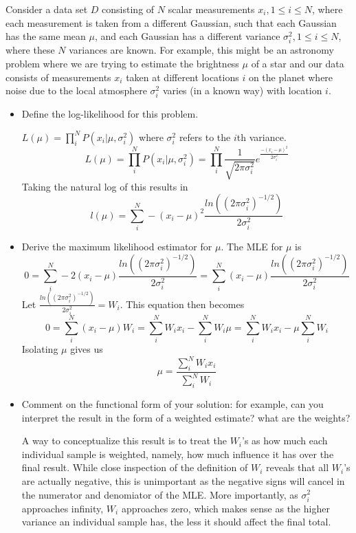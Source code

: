 \documentclass[11pt]{article}
\begin{document}
Consider a data set $D$ consisting of $N$ scalar measurements
$x_i, 1 \le i \le N$, where each measurement is taken from a
different Gaussian, such that each Gaussian has the same mean
$\mu$, and each Gaussian has a different variance $\sigma_i^2, 1
\le i \le N$, where these $N$ variances are known. For example, this might be an
astronomy problem where we are trying to estimate the brightness $\mu$ of a star and our
data consists of measurements $x_i$ taken at different locations $i$ on the planet where
noise due to the local atmosphere $\sigma_i^2$ varies (in a known way) with location $i$.
\begin{itemize}
\item Define the log-likelihood for this problem.

$L(\mu) = \prod_i^N P(x_i | \mu, \sigma_i^2)$ where $\sigma_i^2$ refers to the $i$th variance.
\begin{equation}
L(\mu) = \prod_i^N P(x_i | \mu, \sigma_i^2) = \prod_i^N \frac{1}{\sqrt{2\pi\sigma_i^2}}e^{\frac{-(x_i - \mu)^2}{2\sigma_i^2}}
\end{equation}
Taking the natural log of this results in
\begin{equation}
l(\mu) = \sum_i^N -(x_i - \mu)^2\frac{ln((2\pi\sigma_i^2)^{-1/2})}{2\sigma_i^2}
\end{equation}

\item Derive the maximum likelihood estimator for $\mu$.
The MLE for $\mu$ is 
\begin{equation}
0 = \sum_i^N -2(x_i - \mu)\frac{ln((2\pi\sigma_i^2)^{-1/2})}{2\sigma_i^2} 
= \sum_i^N (x_i - \mu)\frac{ln((2\pi\sigma_i^2)^{-1/2})}{2\sigma_i^2}
\end{equation}
Let $\frac{ln((2\pi\sigma_i^2)^{-1/2})}{2\sigma_i^2} = W_i$. This equation then becomes
\begin{equation}
0 = \sum_i^N (x_i - \mu)W_i = \sum_i^N W_ix_i - \sum_i^N W_i\mu = \sum_i^N W_ix_i - \mu\sum_i^N W_i
\end{equation}
Isolating $\mu$ gives us
\begin{equation}
\mu = \frac{\sum_i^N W_ix_i}{\sum_i^N W_i}
\end{equation}

\item Comment on the functional form of your solution: for
example, can you interpret the result in the form of a weighted
estimate? what are the weights?

A way to conceptualize this result is to treat the $W_i$'s as how much each individual sample 
is weighted, namely, how much influence it has over the final result. While close inspection 
of the definition of $W_i$ reveals that all $W_i$'s are actually negative, this is unimportant as 
the negative signs will cancel in the numerator and denomiator of the MLE. More importantly, 
as $\sigma_i^2$ approaches infinity, $W_i$ approaches zero, which makes sense as the higher variance 
an individual sample has, the less it should affect the final total.
\end{itemize}
\end{document}
